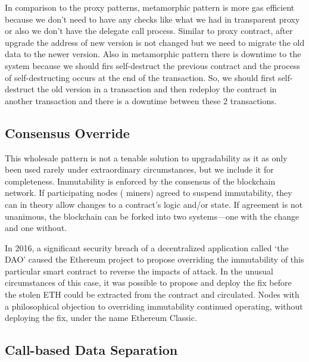 In comparison to the proxy patterns, metamorphic pattern is more gas efficient because we don't need to have any checks like what we had in transparent proxy or also we don't have the delegate call process. Similar to proxy contract, after upgrade the address of new version is not changed but we need to migrate the old data to the newer version. Also in metamorphic pattern there is downtime to the system because we should firs self-destruct the previous contract and the process of self-destructing occurs at the end of the transaction. So, we should first self-destruct the old version in a transaction and then redeploy the contract in another transaction and there is a downtime between these 2 transactions.



\subsection{Consensus Override}
\label{sec:hardfork}

This wholesale pattern is not a tenable solution to upgradability as it as only been used rarely under extraordinary circumstances, but we include it for completeness. Immutability is enforced by the consensus of the blockchain network. If participating nodes (
\eg miners) agreed to suspend immutability, they can in theory allow changes to a contract's logic and/or state. If agreement is not unanimous, the blockchain can be forked into two systems---one with the change and one without. 

In 2016, a significant security breach of a decentralized application called `the DAO' caused the Ethereum project to propose overriding the immutability of this particular smart contract to reverse the impacts of attack. In the unusual circumstances of this case, it was possible to propose and deploy the fix before the stolen ETH could be extracted from the contract and circulated. Nodes with a philosophical objection to overriding immutability continued operating, without deploying the fix, under the name Ethereum Classic.





\subsection{Call-based Data Separation}

